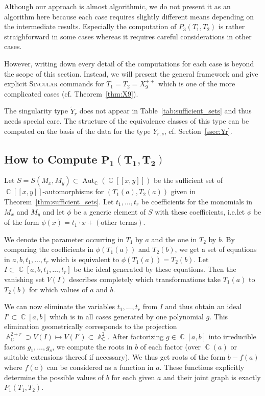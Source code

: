 \documentclass[noend]{amsproc}
\theoremstyle{definition}
\newcommand{\Singular}{\textsc{Singular}}
\newcommand{\tY}{\widetilde{Y}}
\DeclareMathOperator{\C}{\mathbb{C}}
\DeclareMathOperator{\A}{\mathbb{A}}
\DeclareMathOperator{\Aut}{Aut}
\begin{document}
Although our approach is almost algorithmic, we do not present it as an
algorithm here because each case requires slightly different means depending on
the intermediate results. Especially the computation of $P_3(T_1, T_2)$ is
rather straighforward in some cases whereas it requires careful considerations
in other cases.

However, writing down every detail of the computations for each case is beyond
the scope of this section. Instead, we will present the general framework and
give explicit \Singular{} commands for $T_1 = T_2 = X_9^{++}$ which is one of
the more complicated cases (cf. Theorem~\ref{thm:X9}).

The singularity type $\tY_r$ does not appear in Table~\ref{tab:sufficient_sets}
and thus needs special care. The structure of the equivalence classes of this
type can be computed on the basis of the data for the type $Y_{r,s}$, cf.\@
Section~\ref{ssec:Yr}.


\subsection{How to Compute $\boldsymbol{P_1(T_1, T_2)}$}%
\label{ssec:computing_P1}

Let $S = S(M_x, M_y) \subset \Aut_{\C}(\C[[x,y]])$ be the sufficient set of
$\C[[x,y]]$-automorphisms for $(T_1(a), T_2(a))$ given in
Theorem~\ref{thm:sufficient_sets}. Let $t_1, \ldots, t_r$ be coefficients for
the monomials in $M_x$ and $M_y$ and let $\phi$ be a generic element of $S$
with these coefficients, i.e.\@ let $\phi$ be of the form
$\phi(x) = t_1 \cdot x + (\text{other terms})$.

We denote the parameter occurring in $T_1$ by $a$ and the one in $T_2$ by $b$.
By comparing the coefficients in $\phi(T_1(a))$ and $T_2(b)$, we get a set of
equations in $a, b, t_1, \ldots, t_r$ which is equivalent to
$\phi(T_1(a)) = T_2(b)$. Let $I \subset \C[a,b,t_1,\ldots,t_r]$ be the ideal
generated by these equations. Then the vanishing set $V(I)$ describes
completely which transformations take $T_1(a)$ to $T_2(b)$ for which values of
$a$ and $b$.

We can now eliminate the variables $t_1, \ldots, t_r$ from $I$ and thus obtain
an ideal $I' \subset \C[a,b]$ which is in all cases generated by one polynomial
$g$. This elimination geometrically corresponds to the projection
$\A_{\C}^{2+r} \supset V(I) \mapsto V(I') \subset \A_{\C}^2$. After factorizing
$g \in \C[a,b]$ into irreducible factors $g_1, \ldots, g_s$, we compute the
roots in $b$ of each factor (over $\C(a)$ or suitable extensions thereof if
necessary). We thus get roots of the form $b-f(a)$ where $f(a)$ can be
considered as a function in $a$. These functions explicitly determine the
possible values of $b$ for each given $a$ and their joint graph is exactly
$P_1(T_1, T_2)$.
\end{document}
